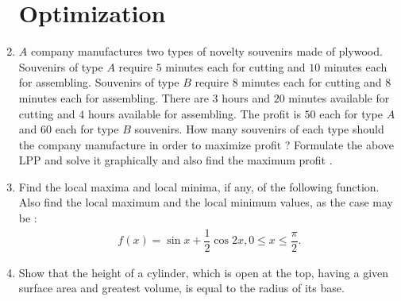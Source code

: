 \documentclass[12pt,-letter paper]{article}
\providecommand{\brak}[1]{\ensuremath{\left(#1\right)}}
\begin{document}
\begin{enumerate}
\section{Optimization}

\item $A$ company manufactures two types of novelty souvenirs made of plywood. Souvenirs of type $A$ require $5$ minutes each for cutting and $10$ minutes each for assembling. Souvenirs of type $B$ require $8$ minutes each for cutting and $8$ minutes each for assembling. There are $3$ hours and $20$ minutes available for cutting and $4$ hours available for  assembling. The profit is \rupee $50$ each for type $A$ and \rupee $60$  each for type $B$ souvenirs. How many souvenirs of each type should the company manufacture in order to maximize profit ? Formulate the above LPP and solve it graphically and also find the maximum profit .

\item Find the local maxima and local minima, if any, of the following function. Also find the local maximum and the local minimum values, as the case may be :
\begin{align*}
    f\brak{x}=\sin x + \dfrac{1}{2} \cos 2x,0\leq x \leq \dfrac{\pi}{2}.
\end{align*}

\item Show that the height of a cylinder, which is open at the top, having a given surface area and greatest volume, is equal to the radius of its base.

\end {enumerate}
\end{document}
